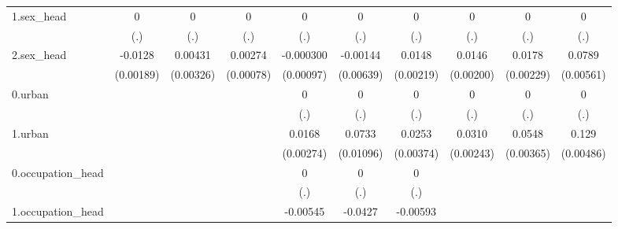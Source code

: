 \begin{table}[htbp]
\begin{tabular}{l*{9}{c}}
1.sex\_head  &           0         &           0         &           0         &           0         &           0         &           0         &           0         &           0         &           0         \\
            &         (.)         &         (.)         &         (.)         &         (.)         &         (.)         &         (.)         &         (.)         &         (.)         &         (.)         \\
2.sex\_head  &     -0.0128\sym{***}&     0.00431         &     0.00274\sym{***}&   -0.000300         &    -0.00144         &      0.0148\sym{***}&      0.0146\sym{***}&      0.0178\sym{***}&      0.0789\sym{***}\\
            &   (0.00189)         &   (0.00326)         &   (0.00078)         &   (0.00097)         &   (0.00639)         &   (0.00219)         &   (0.00200)         &   (0.00229)         &   (0.00561)         \\
0.urban     &                     &                     &                     &           0         &           0         &           0         &           0         &           0         &           0         \\
            &                     &                     &                     &         (.)         &         (.)         &         (.)         &         (.)         &         (.)         &         (.)         \\
1.urban     &                     &                     &                     &      0.0168\sym{***}&      0.0733\sym{***}&      0.0253\sym{***}&      0.0310\sym{***}&      0.0548\sym{***}&       0.129\sym{***}\\
            &                     &                     &                     &   (0.00274)         &   (0.01096)         &   (0.00374)         &   (0.00243)         &   (0.00365)         &   (0.00486)         \\
0.occupation\_head&                     &                     &                     &           0         &           0         &           0         &                     &                     &                     \\
            &                     &                     &                     &         (.)         &         (.)         &         (.)         &                     &                     &                     \\
1.occupation\_head&                     &                     &                     &    -0.00545         &     -0.0427\sym{**} &    -0.00593         &                     &                     &                     \\

\end{tabular}
\end{table}
